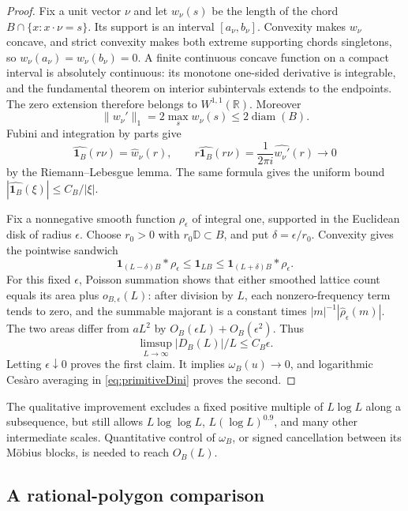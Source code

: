 \begin{proof}
Fix a unit vector $\nu$ and let $w_\nu(s)$ be the length of the
chord $B\cap\{x:x\cdot\nu=s\}$. Its support is an interval
$[a_\nu,b_\nu]$. Convexity makes $w_\nu$ concave, and strict
convexity makes both extreme supporting chords singletons, so
$w_\nu(a_\nu)=w_\nu(b_\nu)=0$. A finite continuous concave
function on a compact interval is absolutely continuous: its
monotone one-sided derivative is integrable, and the fundamental
theorem on interior subintervals extends to the endpoints.
The zero extension therefore belongs to $W^{1,1}(\mathbb R)$.
Moreover
\[
 \|w_\nu'\|_1=2\max_s w_\nu(s)\le2\operatorname{diam}(B).
\]
Fubini and integration by parts give
\[
 \widehat{\mathbf1_B}(r\nu)=\widehat w_\nu(r),\qquad
 r\widehat{\mathbf1_B}(r\nu)
   =\frac1{2\pi i}\widehat{w_\nu'}(r)\longrightarrow0
\]
by the Riemann--Lebesgue lemma. The same formula gives the uniform
bound $|\widehat{\mathbf1_B}(\xi)|\le C_B/|\xi|$.

Fix a nonnegative smooth function $\rho_\epsilon$ of integral one,
supported in the Euclidean disk of radius $\epsilon$. Choose $r_0>0$
with $r_0\mathbb D\subset B$, and put $\delta=\epsilon/r_0$.
Convexity gives the pointwise sandwich
\[
 \mathbf1_{(L-\delta)B}*\rho_\epsilon
 \le\mathbf1_{LB}
 \le\mathbf1_{(L+\delta)B}*\rho_\epsilon.
\]
For this fixed $\epsilon$, Poisson summation shows that either
smoothed lattice count equals its area plus $o_{B,\epsilon}(L)$: after division
by $L$, each nonzero-frequency term tends to zero, and the summable
majorant is a constant times
$|m|^{-1}|\widehat\rho_\epsilon(m)|$.
The two areas differ from $aL^2$ by $O_B(\epsilon L)+O_B(\epsilon^2)$.
Thus
\[
 \limsup_{L\to\infty}|D_B(L)|/L\le C_B\epsilon.
\]
Letting $\epsilon\downarrow0$ proves the first claim. It implies
$\omega_B(u)\to0$, and logarithmic Ces\`aro averaging in
\eqref{eq:primitiveDini} proves the second.
\end{proof}

The qualitative improvement excludes a fixed positive multiple of
$L\log L$ along a subsequence, but still allows $L\log\log L$,
$L(\log L)^{0.9}$, and many other intermediate scales. Quantitative
control of $\omega_B$, or signed cancellation between its M\"obius
blocks, is needed to reach $O_B(L)$.

\subsection{A rational-polygon comparison}
\label{subsec:rationalpolygonbenchmark}

